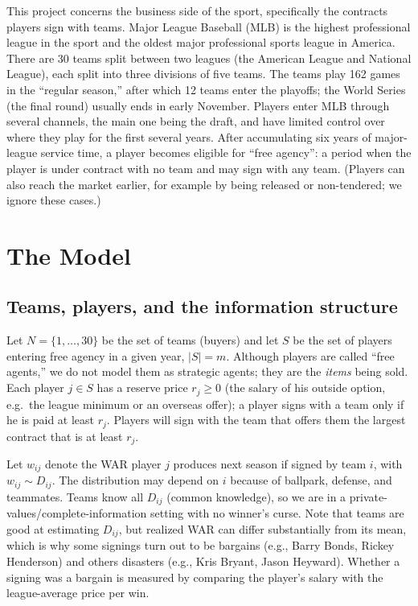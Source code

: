 \documentclass{article}
\begin{document}
This project concerns the business side of the sport, specifically the contracts players sign with teams. Major League Baseball (MLB) is the highest professional league in the sport and the oldest major professional sports league in America. There are 30 teams split between two leagues (the American League and National League), each split into three divisions of five teams. The teams play 162 games in the ``regular season,'' after which 12 teams enter the playoffs; the World Series (the final round) usually ends in early November. Players enter MLB through several channels, the main one being the draft, and have limited control over where they play for the first several years. After accumulating six years of major-league service time, a player becomes eligible for ``free agency'': a period when the player is under contract with no team and may sign with any team. (Players can also reach the market earlier, for example by being released or non-tendered; we ignore these cases.)

\section{The Model}

\subsection{Teams, players, and the information structure}
Let $N = \{1,\dots,30\}$ be the set of teams (buyers) and let $S$ be the set of players entering free agency in a given year, $|S| = m$. Although players are called ``free agents,'' we do not model them as strategic agents; they are the \emph{items} being sold. Each player $j \in S$ has a reserve price $r_j \ge 0$ (the salary of his outside option, e.g.\ the league minimum or an overseas offer); a player signs with a team only if he is paid at least $r_j$. Players will sign with the team that offers them the largest contract that is at least $r_j$.

Let $w_{ij}$ denote the WAR player $j$ produces next season if signed by team $i$, with $w_{ij} \sim D_{ij}$. The distribution may depend on $i$ because of ballpark, defense, and teammates. Teams know all $D_{ij}$ (common knowledge), so we are in a private-values/complete-information setting with no winner's curse. Note that teams are good at estimating $D_{ij}$, but realized WAR can differ substantially from its mean, which is why some signings turn out to be bargains (e.g., Barry Bonds, Rickey Henderson) and others disasters (e.g., Kris Bryant, Jason Heyward)\cite{espn}. Whether a signing was a bargain is measured by comparing the player's salary with the league-average price per win\cite{fangraphs}.
\end{document}
